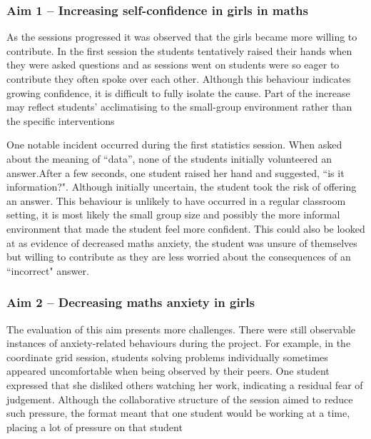 \documentclass[11pt, a4paper, notitlepage]{article}
\begin{document}
\subsubsection*{Aim 1 -- Increasing self-confidence in girls in maths}
As the sessions progressed it was observed that the girls became more willing to contribute. In the first session the students tentatively raised their hands when they were asked questions and as sessions went on students were so eager to contribute they often spoke over each other. Although this behaviour indicates growing confidence, it is difficult to fully isolate the cause. Part of the increase may reflect students' acclimatising to the small-group environment rather than the specific interventions  
\par
One notable incident occurred during the first statistics session. When asked about the meaning of ``data'', none of the students initially volunteered an answer.After a few seconds, one student raised her hand and suggested, ``is it information?". Although initially uncertain, the student took the risk of offering an answer. This behaviour is unlikely to have occurred in a regular classroom setting, it is most likely the small group size and possibly the more informal environment that made the student feel more confident. This could also be looked at as evidence of decreased maths anxiety, the student was unsure of themselves but willing to contribute as they are less worried about the consequences of an ``incorrect" answer.


\subsubsection*{Aim 2 -- Decreasing maths anxiety in girls}
The evaluation of this aim presents more challenges. There were still observable instances of anxiety-related behaviours during the project. For example, in the coordinate grid session, students solving problems individually sometimes appeared uncomfortable when being observed by their peers. One student expressed that she disliked others watching her work, indicating a residual fear of judgement. Although the collaborative structure of the session aimed to reduce such pressure, the format meant that one student would be working at a time, placing a lot of pressure on that student
\end{document}
